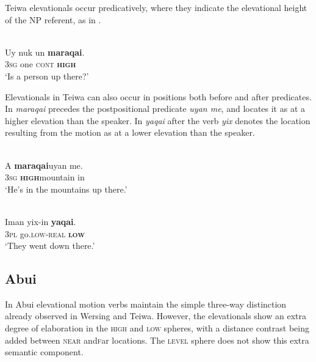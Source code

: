 \documentclass[output=paper]{LSP/langsci}
\begin{document}
Teiwa elevationals occur predicatively, where they indicate the elevational height of the NP referent, as in . 

 

\ea%
\label{ex:7:6}
 \\
\gll  Uy  nuk   un  \textbf{maraqai}. \\
       \textsc{3sg} one  \textsc{cont} \textbf{\textsc{high}} \\
\glt `Is a person up there?'
\z



 

 

Elevationals in Teiwa can also occur in positions both before and after predicates. In  \textit{maraqai} precedes the postpositional predicate \textit{uyan me{\textglotstop}}, and locates it as at a higher elevation than the speaker. In  \textit{yaqai} after the verb \textit{yix} denotes the location resulting from the motion as at a lower elevation than the speaker.



\ea%
\label{ex:7:7}
 \\
\gll A  \textbf{{maraqai}}{uyan}  me{\textglotstop}{.} \\
      \textsc{3sg} \textbf{\textsc{high}}mountain  in    \\
\glt `He's in the mountains up there.'  
\z

 

   

 



\ea%
\label{ex:7:8}
 \\
\gll Iman     yix-in \textbf{yaqai}. \\
       \textsc{3pl} go.\textsc{low}{}-\textsc{real} \textbf{\textsc{low}} \\
\glt  `They went down there.'
\z

 

 



\subsection{Abui}
In Abui elevational motion verbs maintain the simple three-way distinction already observed in Wersing and Teiwa. However, the elevationals show an extra degree of elaboration in the \textsc{high} and \textsc{low} spheres, with a distance contrast being added between \textsc{near} and\textsc far  locations. The \textsc{level} sphere does not show this extra semantic component.
\end{document}
